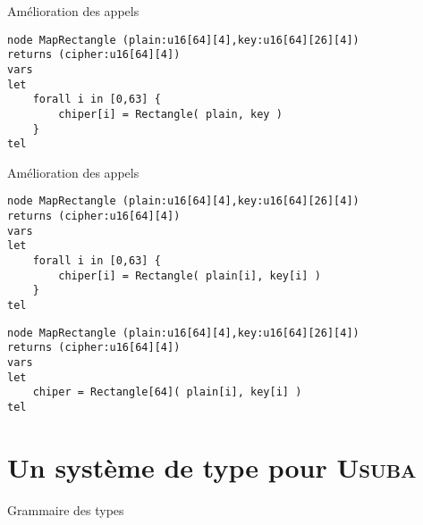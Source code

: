 \documentclass{beamer}
\newcommand{\Usuba}{\textsc{Usuba}}
\begin{document}
\begin{frame}[fragile]{Amélioration des appels}
\scriptsize
\begin{lstlisting}
node MapRectangle (plain:u16[64][4],key:u16[64][26][4])
returns (cipher:u16[64][4])
vars
let
    forall i in [0,63] {
        chiper[i] = Rectangle( plain, key )
    }
tel
\end{lstlisting}

\end{frame}

\begin{frame}[fragile]{Amélioration des appels}
\scriptsize
\begin{lstlisting}
node MapRectangle (plain:u16[64][4],key:u16[64][26][4])
returns (cipher:u16[64][4])
vars
let
    forall i in [0,63] {
        chiper[i] = Rectangle( plain[i], key[i] )
    }
tel
\end{lstlisting}

\begin{lstlisting}
node MapRectangle (plain:u16[64][4],key:u16[64][26][4])
returns (cipher:u16[64][4])
vars
let
    chiper = Rectangle[64]( plain[i], key[i] )
tel
\end{lstlisting}
    
\end{frame}

\section{Un système de type pour \Usuba{}}

\begin{frame}{Grammaire des types}
\begin{figure}[t]
\end{figure}
\end{frame}
        
\end{document}
